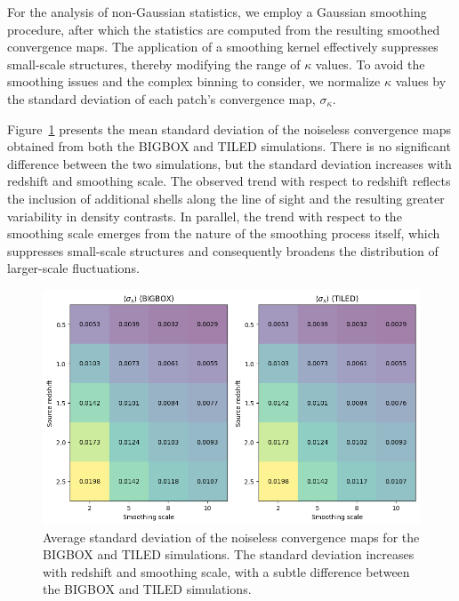 For the analysis of non-Gaussian statistics, we employ a Gaussian smoothing procedure, after which the statistics are computed from the resulting smoothed convergence maps. The application of a smoothing kernel effectively suppresses small-scale structures, thereby modifying the range of $\kappa$ values. To avoid the smoothing issues and the complex binning to consider, we normalize $\kappa$ values by the standard deviation of each patch's convergence map, $\sigma_{\kappa}$. 

Figure~\ref{fig:avg_sigma0} presents the mean standard deviation of the noiseless convergence maps obtained from both the BIGBOX and TILED simulations. There is no significant difference between the two simulations, but the standard deviation increases with redshift and smoothing scale. The observed trend with respect to redshift reflects the inclusion of additional shells along the line of sight and the resulting greater variability in density contrasts. In parallel, the trend with respect to the smoothing scale emerges from the nature of the smoothing process itself, which suppresses small-scale structures and consequently broadens the distribution of larger-scale fluctuations.

\begin{figure}[ht]
    \centering
    \includegraphics[width=\textwidth]{figures/avg_sigma0.png}
    \caption[Average standard deviation of the noiseless convergence maps]{Average standard deviation of the noiseless convergence maps for the BIGBOX and TILED simulations. The standard deviation increases with redshift and smoothing scale, with a subtle difference between the BIGBOX and TILED simulations.} \label{fig:avg_sigma0}
\end{figure}

